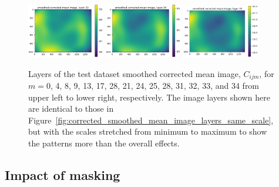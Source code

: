\documentclass[letterpaper,11pt]{article}
\newcommand{\reffig}[1]{Figure~\ref{#1}}
\begin{document}
\begin{figure}[!ht]
\includegraphics[width=0.3\textwidth]{images/results/smoothed_corrected_mean_image_layers/smoothed_corrected_mean_image_layer_33}
\includegraphics[width=0.3\textwidth]{images/results/smoothed_corrected_mean_image_layers/smoothed_corrected_mean_image_layer_34}
\includegraphics[width=0.3\textwidth]{images/results/smoothed_corrected_mean_image_layers/smoothed_corrected_mean_image_layer_35}
\caption{\footnotesize Layers of the test dataset smoothed corrected mean image, $C_{ijm}$, for $m=$0, 4, 8, 9, 13, 17, 28, 21, 24, 25, 28, 31, 32, 33, and 34 from upper left to lower right, respectively. The image layers shown here are identical to those in \reffig{fig:corrected_smoothed_mean_image_layers_same_scale}, but with the scales stretched from minimum to maximum to show the patterns more than the overall effects.}
\label{fig:corrected_smoothed_mean_image_layers}
\end{figure}

\subsection{Impact of masking}
\label{ssec:impact_of_masking}
\end{document}
